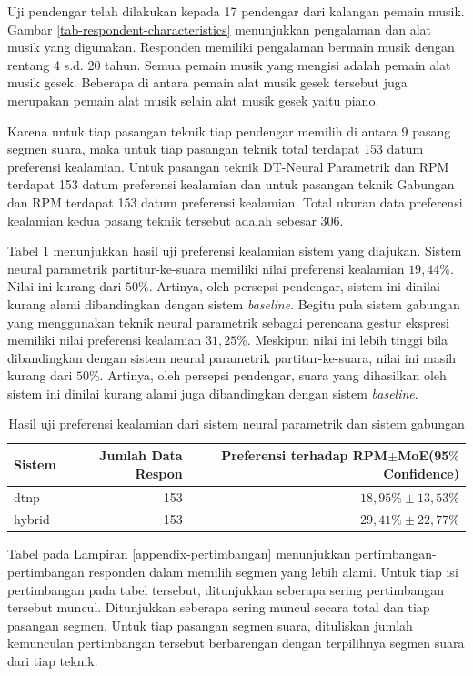 Uji pendengar telah dilakukan kepada 17 pendengar dari kalangan pemain musik. Gambar \ref{tab-respondent-characteristics} menunjukkan pengalaman dan alat musik yang digunakan. Responden memiliki pengalaman bermain musik dengan rentang 4 s.d. 20 tahun. Semua pemain musik yang mengisi adalah pemain alat musik gesek. Beberapa di antara pemain alat musik gesek tersebut juga merupakan pemain alat musik selain alat musik gesek yaitu piano.

Karena untuk tiap pasangan teknik tiap pendengar memilih di antara 9 pasang segmen suara, maka untuk tiap pasangan teknik total terdapat 153 datum preferensi kealamian. Untuk pasangan teknik DT-Neural Parametrik dan RPM terdapat 153 datum preferensi kealamian dan untuk pasangan teknik Gabungan dan RPM terdapat 153 datum preferensi kealamian. Total ukuran data preferensi kealamian kedua pasang teknik tersebut adalah sebesar 306.

Tabel \ref{tab-preference} menunjukkan hasil uji preferensi kealamian sistem yang diajukan. Sistem neural parametrik partitur-ke-suara memiliki nilai preferensi kealamian $19,44\%$. Nilai ini kurang dari $50\%$. Artinya, oleh persepsi pendengar, sistem ini dinilai kurang alami dibandingkan dengan sistem \textit{baseline}. Begitu pula sistem gabungan yang menggunakan teknik neural parametrik sebagai perencana gestur ekspresi memiliki nilai preferensi kealamian $31,25\%$. Meskipun nilai ini lebih tinggi bila dibandingkan dengan sistem neural parametrik partitur-ke-suara, nilai ini masih kurang dari $50\%$. Artinya, oleh persepsi pendengar, suara yang dihasilkan oleh sistem ini dinilai kurang alami juga dibandingkan dengan sistem \textit{baseline}.

\begin{table}[htbp] %
  \begin{center}
    \caption{Hasil uji preferensi kealamian dari sistem neural parametrik dan sistem gabungan}
    \label{tab-preference}
    \begin{tabular}{|l|r|r|}
    \hline
	Sistem&Jumlah Data Respon&Preferensi terhadap RPM$\pm$MoE(95$\%$ Confidence)\\
	\hline
	dtnp&	153&	$18,95\%\pm13,53\%$\\\hline
	hybrid&	153&	$29,41\%\pm22,77\%$\\\hline
	\end{tabular}
  \end{center}
\end{table}

Tabel pada Lampiran \ref{appendix-pertimbangan} menunjukkan pertimbangan-pertimbangan responden dalam memilih segmen yang lebih alami. Untuk tiap isi pertimbangan pada tabel tersebut, ditunjukkan seberapa sering pertimbangan tersebut muncul. Ditunjukkan seberapa sering muncul secara total dan tiap pasangan segmen. Untuk tiap pasangan segmen suara, dituliskan jumlah kemunculan pertimbangan tersebut berbarengan dengan terpilihnya segmen suara dari tiap teknik.

